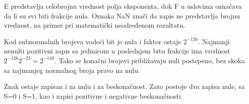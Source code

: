 E predstavlja celobrojnu vrednost polja eksponenta, dok F u uslovima označava da li su svi biti frakcije nula. Oznaka NaN znači da zapis ne predstavlja brojnu vrednost, na primer pri matematički neodređenom rezultatu.

Kod subnormalnih brojeva vodeći bit je nula i faktor ostaje $2^{-126}$. Najmanji nenulti pozitivni zapis sa jedinicom u poslednjem bitu frakcije ima vrednost $2^{-126}2^{-23}=2^{-149}$. Tako se konačni brojevi približavaju nuli postepeno, bez skoka sa najmanjeg normalnog broja pravo na nulu.

Znak ostaje zapisan i za nulu i za beskonačnost. Zato postoje dva zapisa nule, sa S=0 i S=1, kao i zapisi pozitivne i negativne beskonačnosti.
